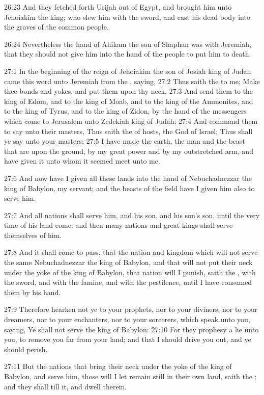 26:23 And they fetched forth Urijah out of Egypt, and brought him unto Jehoiakim the king; who slew him with the sword, and cast his dead body into the graves of the common people.

26:24 Nevertheless the hand of Ahikam the son of Shaphan was with Jeremiah, that they should not give him into the hand of the people to put him to death.

27:1 In the beginning of the reign of Jehoiakim the son of Josiah king of Judah came this word unto Jeremiah from the \LORD, saying, 27:2 Thus saith the \LORD to me; Make thee bonds and yokes, and put them upon thy neck, 27:3 And send them to the king of Edom, and to the king of Moab, and to the king of the Ammonites, and to the king of Tyrus, and to the king of Zidon, by the hand of the messengers which come to Jerusalem unto Zedekiah king of Judah; 27:4 And command them to say unto their masters, Thus saith the \LORD of hosts, the God of Israel; Thus shall ye say unto your masters; 27:5 I have made the earth, the man and the beast that are upon the ground, by my great power and by my outstretched arm, and have given it unto whom it seemed meet unto me.

27:6 And now have I given all these lands into the hand of Nebuchadnezzar the king of Babylon, my servant; and the beasts of the field have I given him also to serve him.

27:7 And all nations shall serve him, and his son, and his son's son, until the very time of his land come: and then many nations and great kings shall serve themselves of him.

27:8 And it shall come to pass, that the nation and kingdom which will not serve the same Nebuchadnezzar the king of Babylon, and that will not put their neck under the yoke of the king of Babylon, that nation will I punish, saith the \LORD, with the sword, and with the famine, and with the pestilence, until I have consumed them by his hand.

27:9 Therefore hearken not ye to your prophets, nor to your diviners, nor to your dreamers, nor to your enchanters, nor to your sorcerers, which speak unto you, saying, Ye shall not serve the king of Babylon: 27:10 For they prophesy a lie unto you, to remove you far from your land; and that I should drive you out, and ye should perish.

27:11 But the nations that bring their neck under the yoke of the king of Babylon, and serve him, those will I let remain still in their own land, saith the \LORD; and they shall till it, and dwell therein.

